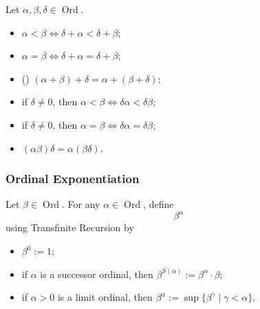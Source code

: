 \documentclass[notoc,notitlepage]{tufte-book}
\DeclareMathOperator{\Ord}{Ord }
\begin{document}
\begin{propo}
\label{propo:properties_of_ordinal_addition_and_ordinal_multiplication}
  Let $\alpha, \beta, \delta \in \Ord$.
  \begin{itemize}
    \item $\alpha < \beta \iff \delta + \alpha < \delta + \beta$;
    \item $\alpha = \beta \iff \delta + \alpha = \delta + \beta$;
    \item () $(\alpha + \beta) + \delta = \alpha + (\beta + \delta)$;
    \item if $\delta \neq 0$, then $\alpha < \beta \iff \delta \alpha < \delta \beta$;
    \item if $\delta \neq 0$, then $\alpha = \beta \iff \delta \alpha = \delta \beta$;
    \item $(\alpha\beta)\delta = \alpha(\beta\delta)$.
  \end{itemize}
\end{propo}

\subsubsection{Ordinal Exponentiation}
\label{ssub:Ordinal Exponentiation}

\begin{defn}
\label{defn:ordinal_exponentiation}
  Let $\beta \in \Ord$. For any $\alpha \in \Ord$, define
  \begin{equation*}
    \beta^\alpha
  \end{equation*}
  using Transfinite Recursion by
  \begin{itemize}
    \item $\beta^0 := 1$;
    \item if $\alpha$ is a successor ordinal, then $\beta^{S(\alpha)} := \beta^{\alpha} \cdot \beta$;
    \item if $\alpha > 0$ is a limit ordinal, then $\beta^\alpha := \sup \{ \beta^\gamma \mid \gamma < \alpha \}$.
  \end{itemize}
\end{defn}

\end{document}

